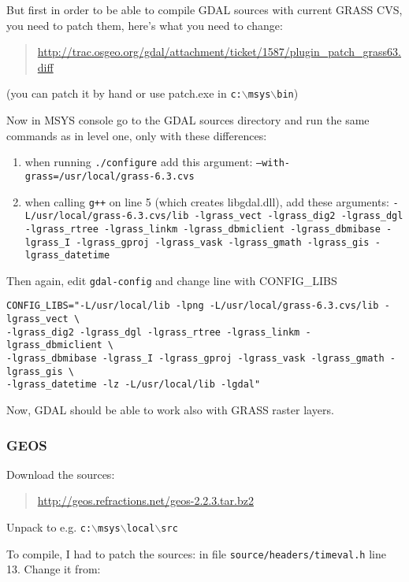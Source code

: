 But first in order to be able to compile GDAL sources with current GRASS CVS, you need to patch them, here's what you need to change:

	\begin{quotation}
\url{http://trac.osgeo.org/gdal/attachment/ticket/1587/plugin\_patch\_grass63.diff}
	\end{quotation}
(you can patch it by hand or use patch.exe in \texttt{c:$\backslash$msys$\backslash$bin})

Now in MSYS console go to the GDAL sources directory and run the same commands as in level one, only with these differences:

\begin{enumerate}
\item when running \texttt{./configure} add this argument: \texttt{--with-grass=/usr/local/grass-6.3.cvs}
\item when calling \texttt{g++} on line 5 (which creates libgdal.dll), add these arguments: \texttt{-L/usr/local/grass-6.3.cvs/lib -lgrass\_vect -lgrass\_dig2 -lgrass\_dgl -lgrass\_rtree -lgrass\_linkm -lgrass\_dbmiclient -lgrass\_dbmibase -lgrass\_I -lgrass\_gproj -lgrass\_vask -lgrass\_gmath -lgrass\_gis -lgrass\_datetime}
\end{enumerate}

Then again, edit \texttt{gdal-config} and change line with CONFIG\_LIBS

\begin{verbatim}
CONFIG_LIBS="-L/usr/local/lib -lpng -L/usr/local/grass-6.3.cvs/lib -lgrass_vect \
-lgrass_dig2 -lgrass_dgl -lgrass_rtree -lgrass_linkm -lgrass_dbmiclient \
-lgrass_dbmibase -lgrass_I -lgrass_gproj -lgrass_vask -lgrass_gmath -lgrass_gis \
-lgrass_datetime -lz -L/usr/local/lib -lgdal" 
\end{verbatim}

Now, GDAL should be able to work also with GRASS raster layers.

\subsubsection{GEOS}
Download the sources:

	\begin{quotation}
\url{http://geos.refractions.net/geos-2.2.3.tar.bz2}
	\end{quotation}

Unpack to e.g. \texttt{c:$\backslash$msys$\backslash$local$\backslash$src}

To compile, I had to patch the sources: in file \texttt{source/headers/timeval.h} line 13.
Change it from:

